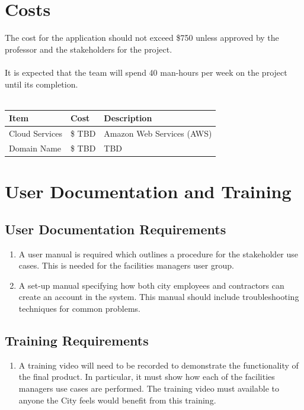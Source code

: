 \documentclass[12pt]{article}
\begin{document}
\section{Costs}
The cost for the application should not exceed \$750 unless approved
by the professor and the stakeholders for the project.\\
\\
It is expected that the team will spend 40 man-hours per week on the
project until its completion.\\
\\
\begin{tabularx}{\textwidth}{p{3cm}p{2cm}X}
  \toprule {\textbf{Item}} & {\textbf{Cost}} & {\textbf{Description}}\\
  \midrule
  Cloud Services   & \$ TBD     & Amazon Web Services (AWS) \\
  Domain Name      & \$ TBD     & TBD           \\
  \bottomrule
\end{tabularx}

\section{User Documentation and Training}
\subsection{User Documentation Requirements}
\begin{enumerate} [{UDT-DR}1.]
  \item A user manual is required which outlines a procedure for the stakeholder
    use cases. This is needed for the facilities managers user group.
  \item A set-up manual specifying how both city employees and contractors
    can create an account in the system. This manual should include
    troubleshooting techniques for common problems.
\end{enumerate}

\subsection{Training Requirements}
\begin{enumerate} [{UDT-TR}1.]
  \item A training video will need to be recorded to demonstrate the
    functionality of the final product. In particular, it must show how each of
    the facilities managers use cases are performed. The training
    video must available to
    anyone the City feels would benefit from this training.
\end{enumerate}
\end{document}
